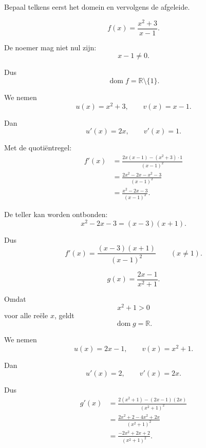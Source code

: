 \documentclass{ximera}
\begin{document}
  \begin{oefening}[Quotiëntregel]{\oefB\ESS}
  
  Bepaal telkens eerst het domein en vervolgens de afgeleide.
  
  \begin{question}
  
  \[
  f(x)=\frac{x^2+3}{x-1}.
  \]
  
  \begin{oplossing}
  De noemer mag niet nul zijn:
  \[
  x-1\neq0.
  \]
  
  Dus
  \[
  \boxed{\operatorname{dom}f=\mathbb{R}\setminus\{1\}}.
  \]
  
  We nemen
  \[
  u(x)=x^2+3,
  \qquad
  v(x)=x-1.
  \]
  
  Dan
  \[
  u'(x)=2x,
  \qquad
  v'(x)=1.
  \]
  
  Met de quotiëntregel:
  \[
  \begin{aligned}
  f'(x)
  &=
  \frac{2x(x-1)-(x^2+3)\cdot1}{(x-1)^2}\\
  &=
  \frac{2x^2-2x-x^2-3}{(x-1)^2}\\
  &=
  \frac{x^2-2x-3}{(x-1)^2}.
  \end{aligned}
  \]
  
  De teller kan worden ontbonden:
  \[
  x^2-2x-3=(x-3)(x+1).
  \]
  
  Dus
  \[
  \boxed{
  f'(x)=\frac{(x-3)(x+1)}{(x-1)^2}
  }
  \qquad (x\neq1).
  \]
  \end{oplossing}
  
  \end{question}
  
  
  \begin{question}
  
  \[
  g(x)=\frac{2x-1}{x^2+1}.
  \]
  
  \begin{oplossing}
  Omdat
  \[
  x^2+1>0
  \]
  voor alle reële $x$, geldt
  \[
  \boxed{\operatorname{dom}g=\mathbb{R}}.
  \]
  
  We nemen
  \[
  u(x)=2x-1,
  \qquad
  v(x)=x^2+1.
  \]
  
  Dan
  \[
  u'(x)=2,
  \qquad
  v'(x)=2x.
  \]
  
  Dus
  \[
  \begin{aligned}
  g'(x)
  &=
  \frac{2(x^2+1)-(2x-1)(2x)}
       {(x^2+1)^2}\\
  &=
  \frac{2x^2+2-4x^2+2x}
       {(x^2+1)^2}\\
  &=
  \frac{-2x^2+2x+2}
       {(x^2+1)^2}.
  \end{aligned}
  \]
  

\end{oplossing}
\end{question}
\end{oefening}
\end{document}

